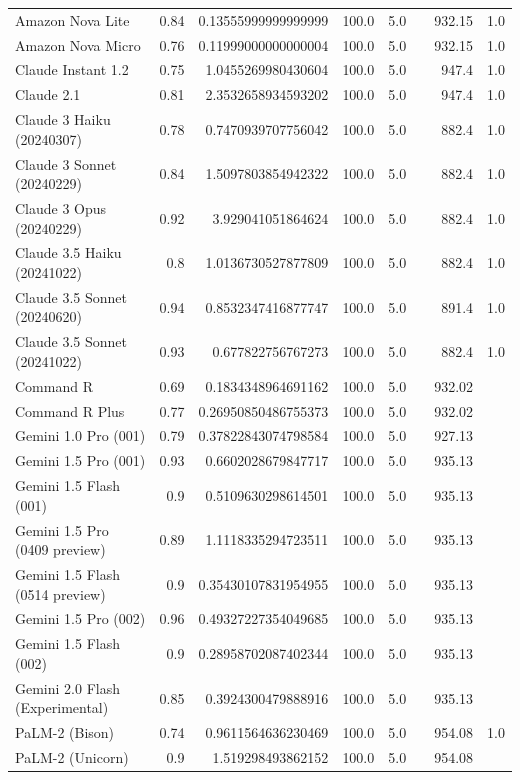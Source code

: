 \begin{table}[htp]
{\begin{tabular}{lrrrrrrr}
Amazon Nova Lite & 0.84 & 0.13555999999999999 & 100.0 & 5.0 &  & 932.15 & 1.0 \\
Amazon Nova Micro & 0.76 & 0.11999000000000004 & 100.0 & 5.0 &  & 932.15 & 1.0 \\
Claude Instant 1.2 & 0.75 & 1.0455269980430604 & 100.0 & 5.0 &  & 947.4 & 1.0 \\
Claude 2.1 & 0.81 & 2.3532658934593202 & 100.0 & 5.0 &  & 947.4 & 1.0 \\
Claude 3 Haiku (20240307) & 0.78 & 0.7470939707756042 & 100.0 & 5.0 &  & 882.4 & 1.0 \\
Claude 3 Sonnet (20240229) & 0.84 & 1.5097803854942322 & 100.0 & 5.0 &  & 882.4 & 1.0 \\
Claude 3 Opus (20240229) & 0.92 & 3.929041051864624 & 100.0 & 5.0 &  & 882.4 & 1.0 \\
Claude 3.5 Haiku (20241022) & 0.8 & 1.0136730527877809 & 100.0 & 5.0 &  & 882.4 & 1.0 \\
Claude 3.5 Sonnet (20240620) & 0.94 & 0.8532347416877747 & 100.0 & 5.0 &  & 891.4 & 1.0 \\
Claude 3.5 Sonnet (20241022) & 0.93 & 0.677822756767273 & 100.0 & 5.0 &  & 882.4 & 1.0 \\
Command R & 0.69 & 0.1834348964691162 & 100.0 & 5.0 &  & 932.02 &  \\
Command R Plus & 0.77 & 0.26950850486755373 & 100.0 & 5.0 &  & 932.02 &  \\
Gemini 1.0 Pro (001) & 0.79 & 0.37822843074798584 & 100.0 & 5.0 &  & 927.13 &  \\
Gemini 1.5 Pro (001) & 0.93 & 0.6602028679847717 & 100.0 & 5.0 &  & 935.13 &  \\
Gemini 1.5 Flash (001) & 0.9 & 0.5109630298614501 & 100.0 & 5.0 &  & 935.13 &  \\
Gemini 1.5 Pro (0409 preview) & 0.89 & 1.1118335294723511 & 100.0 & 5.0 &  & 935.13 &  \\
Gemini 1.5 Flash (0514 preview) & 0.9 & 0.35430107831954955 & 100.0 & 5.0 &  & 935.13 &  \\
Gemini 1.5 Pro (002) & 0.96 & 0.49327227354049685 & 100.0 & 5.0 &  & 935.13 &  \\
Gemini 1.5 Flash (002) & 0.9 & 0.28958702087402344 & 100.0 & 5.0 &  & 935.13 &  \\
Gemini 2.0 Flash (Experimental) & 0.85 & 0.3924300479888916 & 100.0 & 5.0 &  & 935.13 &  \\
PaLM-2 (Bison) & 0.74 & 0.9611564636230469 & 100.0 & 5.0 &  & 954.08 & 1.0 \\
PaLM-2 (Unicorn) & 0.9 & 1.519298493862152 & 100.0 & 5.0 &  & 954.08 &  \\

\end{tabular}}
\end{table}

